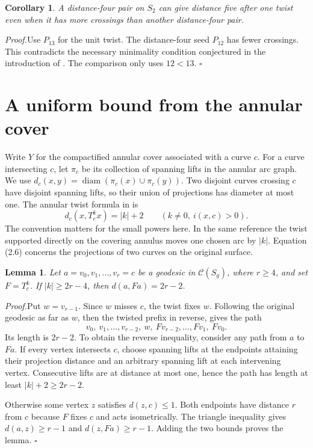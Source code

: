 \documentclass[11pt,a4paper]{article}
\newtheorem{lemma}[theorem]{Lemma}
\newtheorem{corollary}[theorem]{Corollary}
\newcommand{\proof}{\par\noindent\textit{Proof.}\enspace}
\newcommand{\qed}{\hfill\(\square\)\par}
\newcommand{\C}{\mathcal C}
\newcommand{\diam}{\operatorname{diam}}
\begin{document}
\begin{corollary}\label{cor:min}
A distance-four pair on \(S_2\) can give distance five after one twist
even when it has more crossings than another distance-four pair.
\end{corollary}
\proof Use \(P_{13}\) for the unit twist. The distance-four seed \(P_{12}\)
has fewer crossings. This contradicts the necessary minimality condition
conjectured in the introduction of \cite[version 3]{M}. The comparison
only uses \(12<13\). \qed

\clearpage
\section{A uniform bound from the annular cover}
Write \(Y\) for the compactified annular cover associated with a curve
\(c\). For a curve intersecting \(c\), let \(\pi_c\) be its collection of
spanning lifts in the annular arc graph. We use
\(d_c(x,y)=\diam(\pi_c(x)\cup\pi_c(y))\). Two disjoint curves crossing
\(c\) have disjoint spanning lifts, so their union of projections has
diameter at most one. The annular twist formula in
\cite[\S2.4, (2.6)]{MM2} is
\[
 d_c(x,T_c^k x)=|k|+2\qquad(k\ne0,\ i(x,c)>0).
\]
The convention matters for the small powers here. In the same reference
the twist supported directly on the covering annulus moves one chosen
arc by \(|k|\). Equation (2.6) concerns the projections of two curves
on the original surface.

\begin{lemma}\label{lem:fold}
Let \(a=v_0,v_1,\ldots,v_r=c\) be a geodesic in \(\C(S_g)\), where
\(r\ge4\), and set \(F=T_c^k\). If \(|k|\ge2r-4\), then
\(d(a,Fa)=2r-2\).
\end{lemma}
\proof Put \(w=v_{r-1}\). Since \(w\) misses \(c\), the twist fixes
\(w\). Following the original geodesic as far as \(w\), then the twisted
prefix in reverse, gives the path
\[
  v_0,\ v_1,\ldots,v_{r-2},\ w,\ Fv_{r-2},\ldots,Fv_1,\ Fv_0 .
\]
Its length is \(2r-2\). To obtain the reverse inequality, consider any
path from \(a\) to \(Fa\). If every vertex intersects \(c\), choose
spanning lifts at the endpoints attaining their projection distance and
an arbitrary spanning lift at each intervening vertex. Consecutive lifts
are at distance at most one, hence the path has length at least
\(|k|+2\ge2r-2\).

Otherwise some vertex \(z\) satisfies \(d(z,c)\le1\). Both endpoints
have distance \(r\) from \(c\) because \(F\) fixes \(c\) and acts
isometrically. The triangle inequality gives \(d(a,z)\ge r-1\) and
\(d(z,Fa)\ge r-1\). Adding the two bounds proves the lemma. \qed
\end{document}

